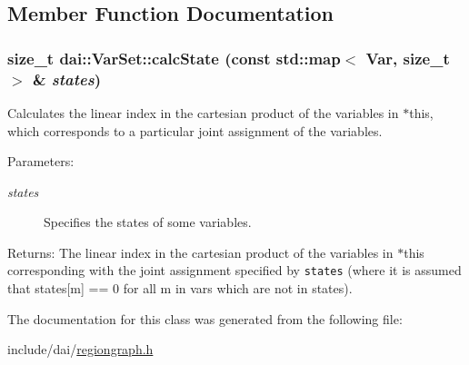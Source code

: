 \subsection{Member Function Documentation}
\hypertarget{classdai_1_1VarSet_a6fd950faa6961c9786e96b04ee2dee1}{
\subsubsection[calcState]{\setlength{\rightskip}{0pt plus 5cm}size\_\-t dai::VarSet::calcState (const std::map$<$ {\bf Var}, size\_\-t $>$ \& {\em states})}}
\label{classdai_1_1VarSet_a6fd950faa6961c9786e96b04ee2dee1}


Calculates the linear index in the cartesian product of the variables in $\ast$this, which corresponds to a particular joint assignment of the variables. 

\begin{Desc}
\item[Parameters:]
\begin{description}
\item[{\em states}]Specifies the states of some variables. \end{description}
\end{Desc}
\begin{Desc}
\item[Returns:]The linear index in the cartesian product of the variables in $\ast$this corresponding with the joint assignment specified by {\tt states} (where it is assumed that states\mbox{[}m\mbox{]} == 0 for all m in vars which are not in states). \end{Desc}


The documentation for this class was generated from the following file:\begin{CompactItemize}
\item 
include/dai/\hyperlink{regiongraph_8h}{regiongraph.h}\end{CompactItemize}
